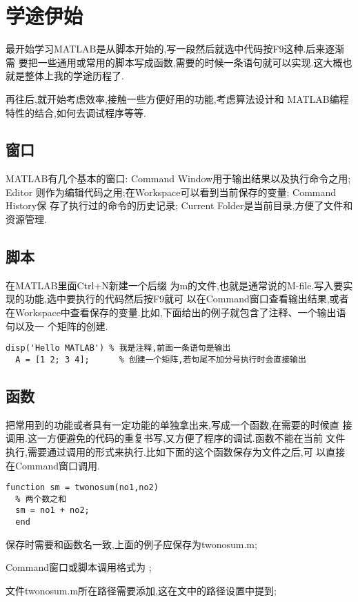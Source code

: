 ﻿\section{学途伊始}
\setcounter{page}{1}
最开始学习MATLAB是从脚本开始的,写一段然后就选中代码按F9这种.后来逐渐需
要把一些通用或常用的脚本写成函数,需要的时候一条语句就可以实现.这大概也
就是整体上我的学途历程了.\par
再往后,就开始考虑效率,接触一些方便好用的功能,考虑算法设计和
MATLAB编程特性的结合,如何去调试程序等等.

\subsection{窗口}
MATLAB有几个基本的窗口: Command Window用于输出结果以及执行命令之用; Editor
则作为编辑代码之用;在Workspace可以看到当前保存的变量; Command History保
存了执行过的命令的历史记录; Current Folder是当前目录,方便了文件和资源管理.

\subsection{脚本}
在MATLAB里面Ctrl+N新建一个后缀
为m的文件,也就是通常说的M-file.写入要实现的功能,选中要执行的代码然后按F9就可
以在Command窗口查看输出结果,或者在Workspace中查看保存的变量.比如,下面给出的例子就包含了注释、一个输出语句以及一
个矩阵的创建.

\vspace{-0.8cm}
\begin{lstlisting}[caption=第一个脚本]
  disp('Hello MATLAB') % 我是注释,前面一条语句是输出
  A = [1 2; 3 4];      % 创建一个矩阵,若句尾不加分号执行时会直接输出
\end{lstlisting}

\subsection{函数}
把常用到的功能或者具有一定功能的单独拿出来,写成一个函数,在需要的时候直
接调用.这一方便避免的代码的重复书写,又方便了程序的调试.函数不能在当前
文件执行,需要通过调用的形式来执行.比如下面的这个函数保存为文件之后,可
以直接在Command窗口调用.

\vspace{-0.8cm}
\begin{lstlisting}[caption = 第一个函数]
  function sm = twonosum(no1,no2)
  % 两个数之和
  sm = no1 + no2;
  end
\end{lstlisting}

\begindot
  \item 保存时需要和函数名一致,上面的例子应保存为twonosum.m;
  \item Command窗口或脚本调用格式为 ;
  \item 文件twonosum.m所在路径需要添加,这在文中的路径设置中提到;
\myenddot

